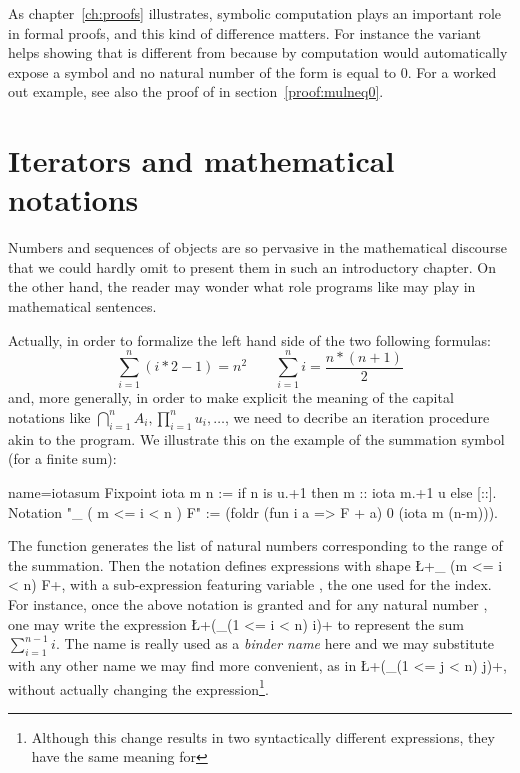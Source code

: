 As chapter~\ref{ch:proofs} illustrates, symbolic computation plays an
important role in formal proofs, and this kind of difference
matters. For instance the  variant helps
showing that  is different from  because by
computation \Coq{} would automatically expose  a  symbol
and no natural number of the form  is equal to 0.
For a worked out example, see also the proof of  in
section~\ref{proof:mulneq0}.


\section{Iterators and mathematical notations}
\label{sec:bigopnat}

Numbers and sequences of objects are so pervasive in the mathematical
discourse that we could hardly omit to present them in such an
introductory chapter. On the other hand, the reader may wonder what role
programs like  may play in mathematical sentences.

Actually, in order to formalize the left hand side of the two
following formulas:
$$
\sum_{i=1}^n (i * 2 - 1) = n ^ 2 \qquad
\sum_{i=1}^n i = \frac{n * (n + 1)}{2}
$$
and, more generally, in order to make explicit the meaning of the capital
notations like $\bigcap_{i=1}^nA_i,
\prod_{i=1}^nu_i, \dots$, we need to decribe an iteration procedure
akin to the  program. We illustrate this on the example of
the summation symbol (for a finite sum):

\begin{coq}{name=iotasum}{}
Fixpoint iota m n := if n is u.+1 then m :: iota m.+1 u else [::].
Notation "\sum_ ( m <= i < n ) F" :=
  (foldr (fun i a => F + a) 0 (iota m (n-m))).
\end{coq}
\index[coq]{\C{\\sum}}

The  function generates the list
\C{[:: m; m+1; ...; m+n-1]}
of natural numbers
corresponding to the range of the summation. Then the notation defines
expressions with shape \L+\sum_ (m <= i < n) F+, with  a
sub-expression featuring variable , the one used for the
index. For instance, once the above notation is granted and for any
natural number , one may write
the \Coq{} expression \L+(\sum_(1 <= i < n) i)+ to represent the
sum $\sum\limits_{i=1}^{n-1} i$. The name  is really used as a
\emph{binder name} here and we may substitute  with any other
name we may find more convenient, as in \L+(\sum_(1 <= j < n) j)+,
without actually changing the expression\footnote{Although this change
results in two syntactically different expressions, they have the same
meaning for \Coq{}}.

